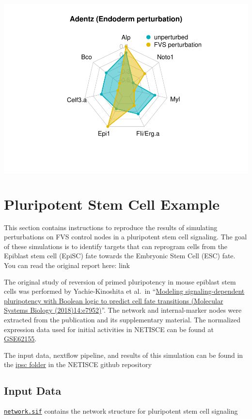 \documentclass[
]{book}
\begin{document}
\includegraphics[width=0.5\linewidth]{_main_files/figure-latex/charts-1}

\hypertarget{pluripotent-stem-cell-example}{%
\chapter{Pluripotent Stem Cell Example}\label{pluripotent-stem-cell-example}}

This section contains instructions to reproduce the results of simulating perturbations on FVS control nodes in a pluripotent stem cell signaling. The goal of these simulations is to identify targets that can reprogram cells from the Epiblast stem cell (EpiSC) fate towards the Embryonic Stem Cell (ESC) fate. You can read the original report here: link

The original study of reversion of primed pluripotency in mouse epiblast stem cells was performed by Yachie-Kinoshita et al.~in ``\href{https://www.embopress.org/doi/full/10.15252/msb.20177952}{Modeling signaling-dependent pluripotency with Boolean logic to predict cell fate transitions (Molecular Systems Biology (2018)14:e7952)}''. The network and internal-marker nodes were extracted from the publication and its supplementary material. The normalized expression data used for initial activities in NETISCE can be found at \href{https://www.ncbi.nlm.nih.gov/geo/query/acc.cgi?acc=GSE62155}{GSE62155}.

The input data, nextflow pipeline, and results of this simulation can be found in the \href{https://github.com/VeraLiconaResearchGroup/Netisce/tree/main/ipsc_validation}{ipsc folder} in the NETISCE github repository

\hypertarget{input-data-1}{%
\section{Input Data}\label{input-data-1}}

\href{https://github.com/VeraLiconaResearchGroup/Netisce/blob/main/ipsc_validation/input_data/network.sif}{\texttt{network.sif}} contains the network structure for pluripotent stem cell signaling
\end{document}
